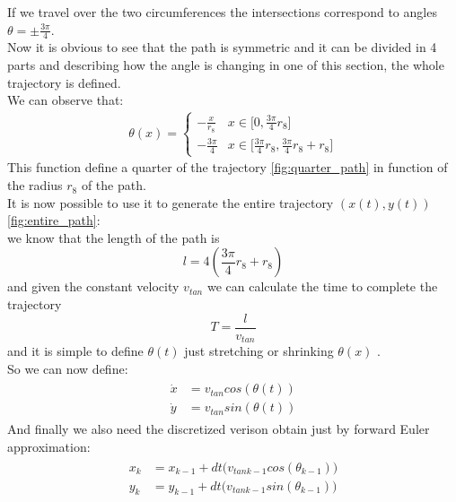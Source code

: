 If we travel over the two circumferences the intersections correspond to angles $\theta = \pm \frac{3\pi}{4}$. \\
Now it is obvious to see that the path is symmetric and it can be divided in 4 parts and describing how the angle is changing in one of this section, the whole trajectory is defined.\\
We can observe that:
\begin{align}
\theta(x) =
\begin{cases}
    -\frac{x}{r_{8}}  &x\in \Big[0,\frac{3\pi}{4}r_{8}\Big] \quad \quad \ \ \  \\[10pt]
    -\frac{3\pi}{4} &x\in \Big[\frac{3\pi}{4}r_{8} ,\frac{3\pi}{4}r_{8} + r_{8}\Big]
\end{cases}
\end{align}
This function define a quarter of the trajectory \ref{fig:quarter_path} in function of the radius $r_{8}$ of the path.\\
It is now possible to use it to generate the entire trajectory $( x(t) , y(t) )$ \ref{fig:entire_path}: \\ we know that the length of the path is $$l = 4(\frac{3\pi}{4}r_{8} + r_{8})$$
and given the constant velocity $v_{tan}$ we can calculate the time to complete the trajectory 
$$T = \frac{l}{v_{tan}}$$
and it is simple to define $\theta(t)$ just stretching or shrinking $\theta(x)$ .\\
So we can now define:
\begin{align}
\begin{split}
\dot{x} &= v_{tan} cos(\theta(t)) \\
\dot{y} &= v_{tan} sin(\theta(t))
\end{split}
\end{align}
And finally we also need the discretized verison obtain just by forward Euler approximation:
\begin{align}
\begin{split}
x_k &= x_{k-1} + dt \big(v_{tan k-1} cos(\theta_{k-1})\big) \\
y_k &= y_{k-1} + dt \big(v_{tan k-1} sin(\theta_{k-1})\big)
\end{split}
\end{align}

